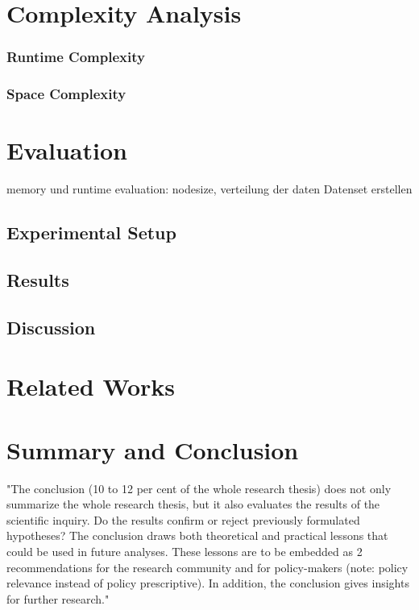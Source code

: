 \documentclass[abstracton,12pt]{scrreprt}
\begin{document}
\chapter{Complexity Analysis}
\subsection{Runtime Complexity}
\subsection{Space Complexity}


\chapter{Evaluation}
\label{sec:Experimental}
memory und runtime evaluation: 
nodesize, verteilung der daten 
Datenset erstellen 


\section{Experimental Setup}
\section{Results}
\section{Discussion}


\chapter{Related Works}


\chapter{Summary and Conclusion}
\label{sec:Summary}
"The conclusion (10 to 12 per cent of the whole research thesis) does not only summarize the whole research thesis, but it also evaluates the results of the scientific inquiry. Do the results confirm or reject previously formulated hypotheses? The conclusion draws both theoretical and practical lessons that could be used in future analyses. These lessons are to be embedded as
2
recommendations for the research community and for policy-makers (note: policy relevance instead of policy prescriptive). In addition, the conclusion gives insights for further research."
\end{document}
